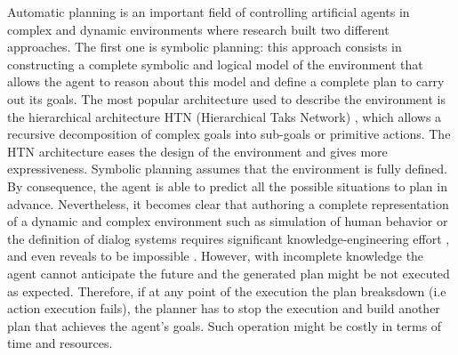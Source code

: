 \documentclass[conference]{IEEEtran}
\begin{document}
	\par Automatic planning is an important field of controlling artificial agents in complex and dynamic environments where research built two different approaches. The first one is symbolic planning: this approach consists in constructing a complete symbolic and logical model of the environment that allows the agent to reason about this model and define a complete plan to carry out its goals.  
	The most popular architecture used to describe the environment is the hierarchical architecture HTN (Hierarchical Taks Network) \cite{erol1996hierarchical}, which allows a recursive decomposition of complex goals into sub-goals or primitive actions. The HTN architecture eases the design of the environment and gives more expressiveness. Symbolic planning assumes that the environment is fully defined. By consequence,  the agent is able to predict all the possible situations to plan in advance. Nevertheless, it becomes clear that authoring a complete representation of a dynamic and complex environment such as simulation of human behavior \cite{conte1998mas} or the definition of dialog systems \cite{allen2002human} requires significant  knowledge-engineering effort \cite{zhuo2009learning}, and even reveals to be impossible \cite{maes1990designing}. However, with incomplete knowledge the agent cannot anticipate the future and the generated plan might be not executed as expected. Therefore, if at any point of the execution the plan breaksdown (i.e action execution fails), the planner has to stop the execution and build another plan that achieves the agent's goals. Such operation might be costly in terms of time and resources. 
	
\end{document}
